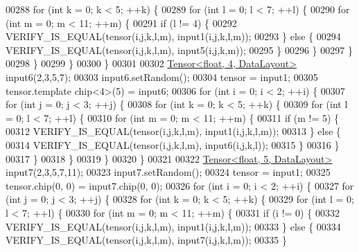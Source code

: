 \begin{DoxyCode}
00288       \textcolor{keywordflow}{for} (\textcolor{keywordtype}{int} k = 0; k < 5; ++k) \{
00289         \textcolor{keywordflow}{for} (\textcolor{keywordtype}{int} l = 0; l < 7; ++l) \{
00290           \textcolor{keywordflow}{for} (\textcolor{keywordtype}{int} m = 0; m < 11; ++m) \{
00291             \textcolor{keywordflow}{if} (l != 4) \{
00292               VERIFY\_IS\_EQUAL(tensor(i,j,k,l,m), input1(i,j,k,l,m));
00293             \} \textcolor{keywordflow}{else} \{
00294               VERIFY\_IS\_EQUAL(tensor(i,j,k,l,m), input5(i,j,k,m));
00295             \}
00296           \}
00297         \}
00298       \}
00299     \}
00300   \}
00301 
00302   \hyperlink{class_eigen_1_1_tensor}{Tensor<float, 4, DataLayout>} input6(2,3,5,7);
00303   input6.setRandom();
00304   tensor = input1;
00305   tensor.template chip<4>(5) = input6;
00306   \textcolor{keywordflow}{for} (\textcolor{keywordtype}{int} i = 0; i < 2; ++i) \{
00307     \textcolor{keywordflow}{for} (\textcolor{keywordtype}{int} j = 0; j < 3; ++j) \{
00308       \textcolor{keywordflow}{for} (\textcolor{keywordtype}{int} k = 0; k < 5; ++k) \{
00309         \textcolor{keywordflow}{for} (\textcolor{keywordtype}{int} l = 0; l < 7; ++l) \{
00310           \textcolor{keywordflow}{for} (\textcolor{keywordtype}{int} m = 0; m < 11; ++m) \{
00311             \textcolor{keywordflow}{if} (m != 5) \{
00312               VERIFY\_IS\_EQUAL(tensor(i,j,k,l,m), input1(i,j,k,l,m));
00313             \} \textcolor{keywordflow}{else} \{
00314               VERIFY\_IS\_EQUAL(tensor(i,j,k,l,m), input6(i,j,k,l));
00315             \}
00316           \}
00317         \}
00318       \}
00319     \}
00320   \}
00321 
00322   \hyperlink{class_eigen_1_1_tensor}{Tensor<float, 5, DataLayout>} input7(2,3,5,7,11);
00323   input7.setRandom();
00324   tensor = input1;
00325   tensor.chip(0, 0) = input7.chip(0, 0);
00326   \textcolor{keywordflow}{for} (\textcolor{keywordtype}{int} i = 0; i < 2; ++i) \{
00327     \textcolor{keywordflow}{for} (\textcolor{keywordtype}{int} j = 0; j < 3; ++j) \{
00328       \textcolor{keywordflow}{for} (\textcolor{keywordtype}{int} k = 0; k < 5; ++k) \{
00329         \textcolor{keywordflow}{for} (\textcolor{keywordtype}{int} l = 0; l < 7; ++l) \{
00330           \textcolor{keywordflow}{for} (\textcolor{keywordtype}{int} m = 0; m < 11; ++m) \{
00331             \textcolor{keywordflow}{if} (i != 0) \{
00332               VERIFY\_IS\_EQUAL(tensor(i,j,k,l,m), input1(i,j,k,l,m));
00333             \} \textcolor{keywordflow}{else} \{
00334               VERIFY\_IS\_EQUAL(tensor(i,j,k,l,m), input7(i,j,k,l,m));
00335             \}

\end{DoxyCode}
